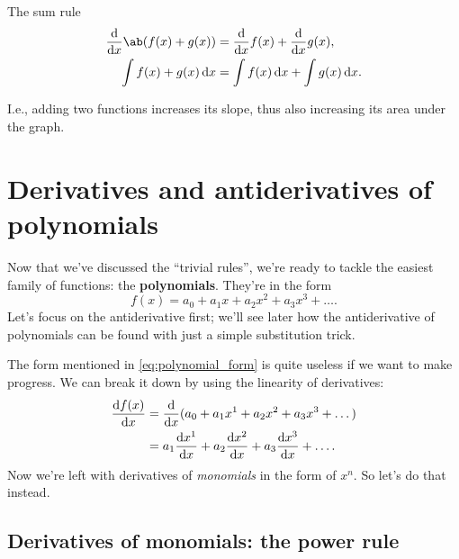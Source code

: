 \begin{prop}{The sum rule}{}
  \begin{align}
    \odv*{\ab(f(x) + g(x))}{x} & = \odv*{f(x)}{x} + \odv*{g(x)}{x}, \label{eq:derivativesumrule}      \\
    \int f(x) + g(x)\odif{x}   & = \int f(x)\odif{x} + \int g(x)\odif{x}. \label{eq:integralssumrule}
  \end{align}
\end{prop}
I.e., adding two functions increases its slope, thus also increasing its area under the graph.

\section{Derivatives and antiderivatives of polynomials}

Now that we've discussed the \enquote{trivial rules}, we're ready to tackle the easiest family of functions: the \textbf{polynomials}. They're in the form
\begin{equation}
  f(x) = a_0 + a_1x + a_2x^2 + a_3x^3 + \dots. \label{eq:polynomial_form}
\end{equation}
Let's focus on the antiderivative first; we'll see later how the antiderivative of polynomials can be found with just a simple substitution trick.

The form mentioned in \cref{eq:polynomial_form} is quite useless if we want to make progress. We can break it down by using the linearity of derivatives:
\begin{align}
  \odv{f(x)}{x} & = \odv*{(a_0 + a_1x^1 + a_2x^2 + a_3x^3 + \dots)}{x}            \\
                & = a_1\odv{x^1}{x} + a_2\odv{x^2}{x} + a_3\odv{x^3}{x} + \dots.
\end{align}
Now we're left with derivatives of \emph{monomials} in the form of $x^n$. So let's do that instead.

\subsection{Derivatives of monomials: the power rule}
\label{sec:derivativespowerrule}

